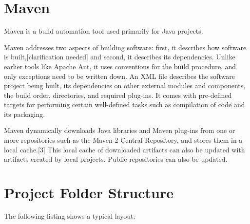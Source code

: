 \documentclass{report}
\begin{document}
	\section{Maven}

	Maven is a build automation tool used primarily for Java projects.
	
	Maven addresses two aspects of building software: first, it describes how software is built,[clarification needed] and second, it describes its dependencies. Unlike earlier tools like Apache Ant, it uses conventions for the build procedure, and only exceptions need to be written down. An XML file describes the software project being built, its dependencies on other external modules and components, the build order, directories, and required plug-ins. It comes with pre-defined targets for performing certain well-defined tasks such as compilation of code and its packaging.
	
	Maven dynamically downloads Java libraries and Maven plug-ins from one or more repositories such as the Maven 2 Central Repository, and stores them in a local cache.[3] This local cache of downloaded artifacts can also be updated with artifacts created by local projects. Public repositories can also be updated. 
	
	\newpage
	\section{Project Folder Structure}
	The following listing shows a typical layout:
	\newline
	\newpage
	
\end{document}
